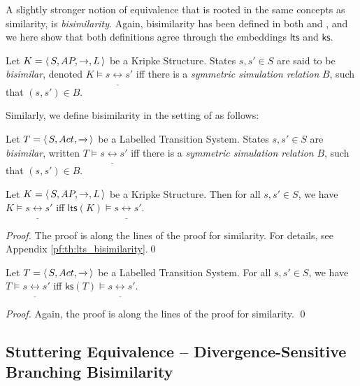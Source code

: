 \documentclass{llncs}
\newcommand{\ltstrans}[1]{\xrightarrow{#1}}
\newcommand{\kstrans}{\to}
\newcommand{\bisim}{\mbox{$\underline{\leftrightarrow}$}}
\newcommand{\lts}{\mathsf{lts}}
\newcommand{\ks}{\mathsf{ks}}
\begin{document}
A slightly stronger notion of equivalence that is rooted in the same concepts
as similarity, is \emph{bisimilarity}. Again, bisimilarity has been defined
in both \KS and \LTS, and we here show that both definitions agree through
the embeddings $\lts$ and $\ks$.

\begin{definition}
Let $K = \tuple{S, \AP, \kstrans, L}$ be a Kripke Structure. States
$s,s' \in S$ are said to be \emph{bisimilar}, denoted
$K \models s \bisim s'$ iff there is a \emph{symmetric
simulation relation} $B$, such that $(s,s') \in B$.

\end{definition}
Similarly, we define bisimilarity in the setting of \LTS as follows:

\begin{definition}
Let $T = \tuple{S, \act, \ltstrans{}}$ be a Labelled Transition System.
States $s,s' \in S$ are \emph{bisimilar}, written $T \models s \bisim s'$ iff
there is a \emph{symmetric simulation relation} $B$, such that
$(s,s') \in B$.

\end{definition}

\begin{theorem}
\label{th:lts_bisimilarity}
Let $K = \tuple{S, \AP, \kstrans, L}$ be a Kripke Structure. Then for all
$s,s' \in S$, we have $K \models s \bisim s'$ iff $\lts(K) \models s \bisim s'$.
\end{theorem}

\begin{proof}
The proof is along the lines of the proof for similarity. For details,
see Appendix \ref{pf:th:lts_bisimilarity}.\qed
\end{proof}

\begin{theorem}
Let $T = \tuple{S, \act, \ltstrans{}}$ be a Labelled Transition System.
For all $s, s' \in S$, we have $T \models s \bisim s'$ iff $
\ks(T) \models s \bisim s'$.
\end{theorem}

\begin{proof} Again, the proof is along the lines of the proof for
similarity. \qed
\end{proof}


\subsection{Stuttering Equivalence -- Divergence-Sensitive Branching
Bisimilarity}
\label{sec:stuttering}
\end{document}

